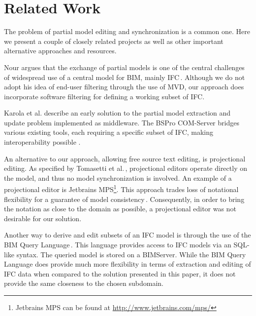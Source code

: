 \section{Related Work}
\label{sec:related_work}
The problem of partial model editing and synchronization is a common one. Here we present a couple of closely related projects as well as other important alternative approaches and resources.

Nour argues that the exchange of partial models is one of the central challenges of widespread use of a central model for BIM, mainly IFC\,\cite{nour08}. Although we do not adopt his idea of end-user filtering through the use of MVD, our approach does incorporate software filtering for defining a working subset of IFC.

Karola et al. describe an early solution to the partial model extraction and update problem implemented as middleware. The BSPro COM-Server bridges various existing tools, each requiring a specific subset of IFC, making interoperability possible \cite{karola02}.

An alternative to our approach, allowing free source text editing, is projectional editing. As specified by Tomasetti et al.\,\cite{tomasetti11}, projectional editors operate directly on the model, and thus no model synchronization is involved. An example of a projectional editor is Jetbrains MPS\footnote{Jetbrains MPS can be found at \url{http://www.jetbrains.com/mps/}}. This approach trades loss of notational flexibility for a guarantee of model consistency\,\cite{conf/models/Voelter10}. Consequently, in order to bring the notation as close to the domain as possible, a projectional editor was not desirable for our solution.

Another way to derive and edit subsets of an IFC model is through the use of the BIM Query Language\,\cite{mazairac10}. This language provides access to IFC models via an SQL-like syntax. The queried model is stored on a BIMServer. While the BIM Query Language does provide much more flexibility in terms of extraction and editing of IFC data when compared to the solution presented in this paper, it does not provide the same closeness to the chosen subdomain.

